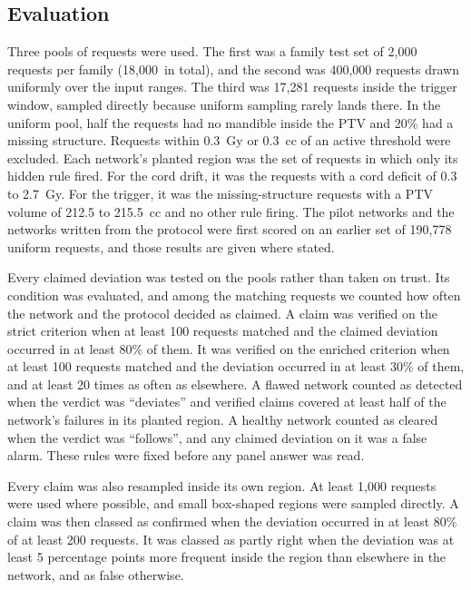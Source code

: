 \documentclass[aps,prx,reprint,superscriptaddress,nofootinbib]{revtex4-2}
\begin{document}
\subsection{Evaluation}\label{evaluation}

Three pools of requests were used. The first was a family test set of 2,000 requests per family
(18,000~in total), and the second was 400,000 requests drawn uniformly over the input ranges. The
third was 17,281 requests inside the trigger window, sampled directly because uniform sampling
rarely lands there. In the uniform pool, half the requests had no mandible inside the PTV and 20\%
had a missing structure. Requests within 0.3~Gy or 0.3~cc of an active threshold were excluded. Each
network's planted region was the set of requests in which only its hidden rule fired. For the cord
drift, it was the requests with a cord deficit of 0.3 to 2.7~Gy. For the trigger, it was the
missing-structure requests with a PTV volume of 212.5 to 215.5~cc and no other rule firing. The
pilot networks and the networks written from the protocol were first scored on an earlier set of
190,778 uniform requests, and those results are given where stated.

Every claimed deviation was tested on the pools rather than taken on trust. Its condition was
evaluated, and among the matching requests we counted how often the network and the protocol decided
as claimed. A claim was verified on the strict criterion when at least 100 requests matched and the
claimed deviation occurred in at least 80\% of them. It was verified on the enriched criterion when
at least 100 requests matched and the deviation occurred in at least 30\% of them, and at least 20
times as often as elsewhere. A flawed network counted as detected when the verdict was ``deviates''
and verified claims covered at least half of the network's failures in its planted region. A healthy
network counted as cleared when the verdict was ``follows'', and any claimed deviation on it was a
false alarm. These rules were fixed before any panel answer was read.

Every claim was also resampled inside its own region. At least 1,000 requests were used where
possible, and small box-shaped regions were sampled directly. A claim was then classed as confirmed
when the deviation occurred in at least 80\% of at least 200 requests. It was classed as partly
right when the deviation was at least 5 percentage points more frequent inside the region than
elsewhere in the network, and as false otherwise.
\end{document}
